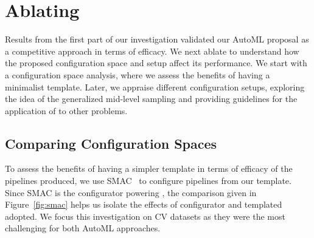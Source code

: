 
\section{Ablating \isklearn}
\label{sec:further}

Results from the first part of our investigation validated our \irace AutoML proposal as a competitive approach in terms of efficacy. We next ablate \isklearn to understand how the proposed configuration space and setup affect its performance. We start with a configuration space analysis,  where we assess the benefits of having a minimalist template. Later, we appraise different configuration setups, exploring the idea of the generalized mid-level sampling and providing guidelines for the application of \isklearn to other problems.


%
\subsection{Comparing Configuration Spaces}

To assess the benefits of having a simpler template in terms of efficacy of the pipelines produced, we use SMAC~\cite{smac} to configure pipelines from our template. Since SMAC is the configurator powering \autosklearn, the comparison given in Figure~\ref{fig:smac} helps us isolate the effects of configurator and templated adopted. We focus this investigation on CV datasets as they were the most challenging for both AutoML approaches.

